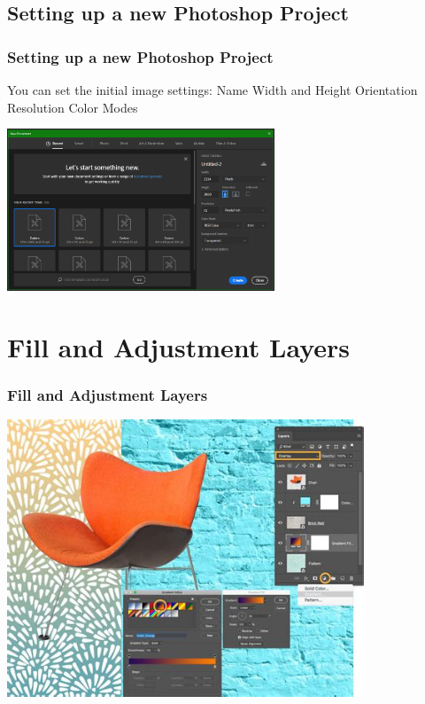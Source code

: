 \documentclass{beamer}
\begin{document}
\subsection{Setting up a new Photoshop Project}	
\begin{frame}
	\frametitle{Setting up a new Photoshop Project}
	\begin{outline}
		\1 You can set the initial image settings:
		\2 Name
		\2 Width and Height
		\2 Orientation
		\2 Resolution
		\2 Color Modes
	\end{outline}
	\begin{center}
		\includegraphics[width = 0.6\textwidth]{images/new project 2.png}
	\end{center}
\end{frame}
	
	
	\section{Fill and Adjustment Layers}
	\begin{frame}
		\frametitle{Fill and Adjustment Layers}
		\begin{center}
			\includegraphics[width = 0.8\textwidth]{images/adjust and fill layers.jpg}
		\end{center}
	\end{frame}
	
\end{document}
